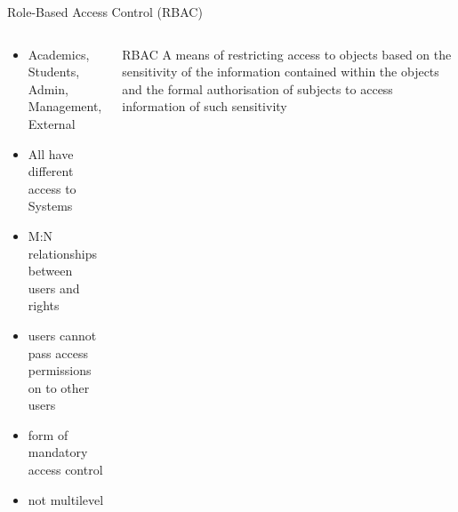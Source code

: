 \documentclass[pdf,table]{beamer}
\begin{document}
\begin{frame}{Role-Based Access Control (RBAC)}
	\begin{columns}[T]
		\begin{column}{0.48\textwidth}
			\begin{itemize}
				\item Academics, Students, Admin, Management, External 
				\item All have different access to Systems
				\item M:N relationships between users and rights
				\item users cannot pass access permissions on to other users
				\item form of mandatory access control	
				\item not multilevel

			\end{itemize}
		\end{column}
		\begin{column}{0.48\textwidth}
			\begin{block}{RBAC}
				A means of restricting access to objects based on the sensitivity of the information contained within the objects and the formal authorisation of subjects to access information of such sensitivity 
				\cite{ferraiolo2001proposed}
			\end{block}
		\end{column}
	\end{columns}	
\end{frame}
\end{document}
